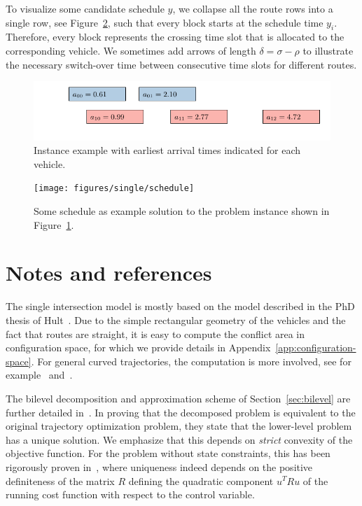 \documentclass[a4paper]{report}
\theoremstyle{definition}
\theoremstyle{plain}
\begin{document}
To visualize some candidate schedule $y$, we collapse all the route rows into a
single row, see Figure~\ref{fig:solution-example}, such that every block starts at the schedule time
$y_i$. Therefore, every block represents the crossing time slot that is
allocated to the corresponding vehicle. We sometimes add arrows of length
$\delta = \sigma - \rho$ to illustrate the necessary switch-over time between
consecutive time slots for different routes.

\def\vizfigscale{0.90}
\begin{figure}[h]
  \centering
  \includegraphics[scale=\vizfigscale]{../single/figures/instance}
  \caption{Instance example with earliest arrival times indicated for each vehicle.}%
  \label{fig:instance-example}
\end{figure}

\begin{figure}[h]
  \centering
  \texttt{[image: figures/single/schedule]}
  \caption{Some schedule as example solution to the problem instance shown in Figure~\ref{fig:instance-example}.}%
  \label{fig:solution-example}
\end{figure}

\pagebreak
\section{Notes and references}

The single intersection model is mostly based on the model described in the PhD
thesis of Hult~\cite[Chapter 3]{hultOptimizationBasedCoordination2019}.
%
Due to the simple rectangular geometry of the vehicles and the fact that routes
are straight, it is easy to compute the conflict area in configuration space,
for which we provide details in Appendix~\ref{app:configuration-space}. For
general curved trajectories, the computation is more involved, see for
example~\cite[Appendix A]{levinConflictpointFormulationIntersection2017}
and~\cite[Section 2.2]{liTemporalspatialDimensionExtensionbased2019}.

The bilevel decomposition and approximation scheme of Section~\ref{sec:bilevel}
are further detailed in~\cite{hultApproximateSolutionOptimal2015,hultTechnicalReportApproximate}.
%
In proving that the decomposed problem is equivalent to the original trajectory
optimization problem, they state that the lower-level problem has a unique
solution. We emphasize that this depends on \emph{strict} convexity of the objective function.
%
For the problem without state constraints, this has been rigorously proven in~\cite[Theorem 5.1, part
(V)]{hanUnifiedNumericalScheme2012}, where uniqueness indeed depends on the positive
definiteness of the matrix $R$ defining the quadratic component $u^T R u$ of the
running cost function with respect to the control variable.
\end{document}
